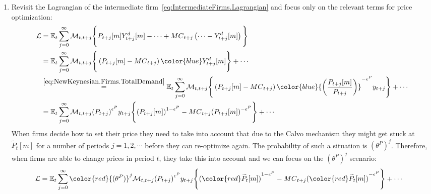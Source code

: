 \begin{enumerate}
\item
Revisit the Lagrangian of the intermediate firm~\eqref{eq:IntermediateFirms.Lagrangian}
  and focus only on the relevant terms for price optimization:
\begin{align*}
\mathcal{L} &= \mathbb{E}_{t} \sum_{j=0}^{\infty} \mathcal{M}_{t,t+j} \Bigg \{
P_{t+j}[m] Y^{d}_{t+j}[m] - \cdots
+ {MC}_{t+j} \left(
  \cdots - Y^{d}_{t+j}[m]\right)
\Bigg \}
\\
&= \mathbb{E}_{t} \sum_{j=0}^{\infty} \mathcal{M}_{t,t+j} \Bigg \{
\left(P_{t+j}[m] - {MC}_{t+j}\right) {\color{blue}Y^{d}_{t+j}[m]}
\Bigg \} + \cdots
\\
&\overset{\eqref{eq:NewKeynesian.Firms.TotalDemand}}{=} \mathbb{E}_{t} \sum_{j=0}^{\infty} \mathcal{M}_{t,t+j} \Bigg \{
\left(P_{t+j}[m] - {MC}_{t+j}\right) {\color{blue} {\left(\frac{P_{t+j}[m]}{P_{t+j}}\right)}^{-\epsilon^{P}} y_{t+j}}
\Bigg \} + \cdots
\\
&= \mathbb{E}_{t} \sum_{j=0}^{\infty} \mathcal{M}_{t,t+j} {(P_{t+j})}^{\epsilon^{P}} y_{t+j}
\Bigg \{
{(P_{t+j}[m])}^{1-\epsilon^{P}} - {MC}_{t+j}{(P_{t+j}[m])}^{-\epsilon^{P}}
\Bigg \} + \cdots
\end{align*}
When firms decide how to set their price they need to take into account
  that due to the Calvo mechanism they might get stuck at \(\widetilde{P}_{t}[m]\) for a number of periods \(j=1,2,\cdots \)
  before they can re-optimize again.
The probability of such a situation is \({(\theta^P)}^{j}\).
Therefore, when firms are able to change prices in period \(t\),
  they take this into account and we can focus on the \({(\theta^P)}^{j}\) scenario:
\begin{align*}
\mathcal{L} &= 
\mathbb{E}_{t} \sum_{j=0}^{\infty} {\color{red} {(\theta^P)}^{j}} \mathcal{M}_{t,t+j} {(P_{t+j})}^{\epsilon^{P}} y_{t+j}
\Bigg \{
{({\color{red} \widetilde{P}_{t}[m]})}^{1-\epsilon^{P}} - {MC}_{t+j}{({\color{red} \widetilde{P}_{t}[m]})}^{-\epsilon^{P}}
\Bigg \} + \cdots
\end{align*}


\end{enumerate}
